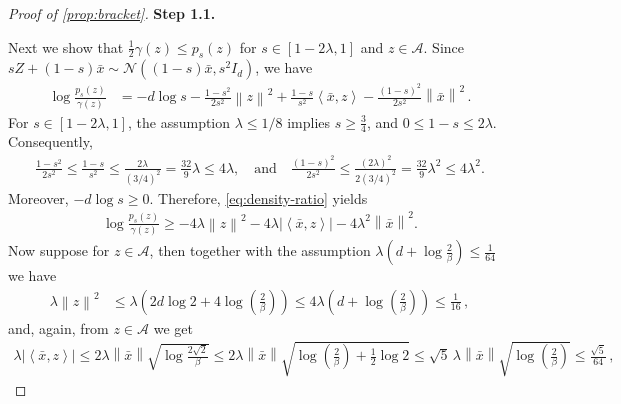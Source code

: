 \documentclass[11pt]{article}
\newcommand{\proofstepinline}[1]{%
    {\sffamily\bfseries\color{blue!55!black}Step #1.}\enspace
}
\newcommand{\N}{\mathcal N}
\newcommand{\1}{\mathbf 1}
\newcommand{\ip}[2]{\left\langle #1,#2\right\rangle}
\newcommand{\norm}[1]{\left\lVert #1\right\rVert}
\begin{document}
\begin{proof}[Proof of \cref{prop:bracket}]
    \proofstepinline{1.1}
    Next we show that $\frac12\gamma(z)\leq p_s(z)$ for $s\in[1-2\lambda,1]$ and $z\in\mathcal A$.
    Since $sZ+(1-s)\bar{x}\sim\N((1-s)\bar{x},s^2I_d)$,
    we have
    \begin{align}
        \log\frac{p_s(z)}{\gamma(z)}
         & =-d\log s
        -\frac{1-s^2}{2s^2}\norm{z}^2
        +\frac{1-s}{s^2}\ip{\bar{x}}{z}
        -\frac{(1-s)^2}{2s^2}\norm{\bar{x}}^2\,.
        \label{eq:density-ratio}
    \end{align}
    For $s\in[1-2\lambda,1]$, the assumption $\lambda\leq1/8$ implies $s\geq\frac34$, and $0\leq1-s\leq2\lambda$.
    Consequently,
    \begin{align}
        \frac{1-s^2}{2s^2}
        \leq
        \frac{1-s}{s^2}
        \leq
        \frac{2\lambda}{(3/4)^2}
        =
        \frac{32}{9}\lambda
        \leq4\lambda,
        \quad\text{and}\quad
        \frac{(1-s)^2}{2s^2}
        \leq
        \frac{(2\lambda)^2}{2(3/4)^2}
        =
        \frac{32}{9}\lambda^2
        \leq4\lambda^2.
    \end{align}
    Moreover, $-d\log s\geq0$. Therefore,
    \eqref{eq:density-ratio} yields
    \begin{align}
        \log\frac{p_s(z)}{\gamma(z)}
        \geq
        -4\lambda\norm{z}^2
        -4\lambda\left|\ip{\bar{x}}{z}\right|
        -4\lambda^2\norm{\bar{x}}^2.
        \label{eq:density-ratio-lower}
    \end{align}
    Now suppose for $z\in\mathcal A$, then
    together with the assumption $\lambda\left(d+\log\frac2\beta\right)\leq \frac{1}{64}$ we have
    \begin{align}
        \lambda\norm{z}^2
         & \leq
        \lambda\left(
        2d\log2+4\log\left(\frac2\beta\right)
        \right)
        \leq
        4\lambda\left(d+\log\left(\frac2\beta\right)\right)
        \leq
        \frac{1}{16}\,,
        \label{ineq:lambda-z-squared-bound}
    \end{align}
    and, again, from $z\in\mathcal A$ we get
    \begin{align}
        \lambda\left|\ip{\bar{x}}{z}\right|
        \leq
        2\lambda\norm{\bar{x}}
        \sqrt{\log\frac{2\sqrt2}{\beta}}
        \leq
        2\lambda\norm{\bar{x}}
        \sqrt{
            \log\left(
            \frac{2}{\beta}
            \right)
            +\frac12\log2
        }
        \leq
        \sqrt5\,
        \lambda\norm{\bar{x}}\sqrt{\log\left(\frac{2}{\beta}\right)}
        \leq
        \frac{\sqrt5}{64}\,,
    \end{align}

\end{proof}
\end{document}
